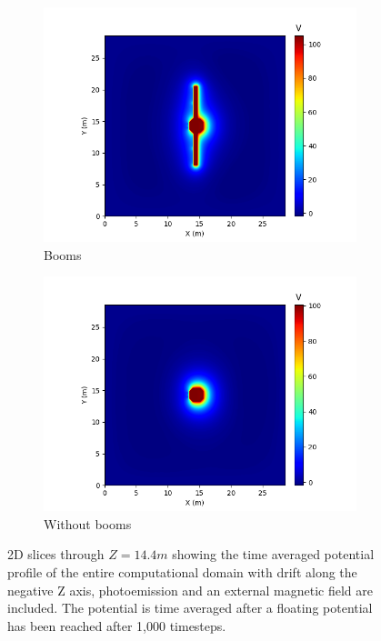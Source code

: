 \begin{figure}[H]
  \begin{subfigure}[b]{0.6\textwidth}
    \includegraphics[width=\textwidth]{figures/MMO/BField/WB/P_BField_WB.png}
    \caption{Booms}
    \label{fig:P_BField_WB}
  \end{subfigure}
  \hfill
  \begin{subfigure}[b]{0.6\textwidth}
    \includegraphics[width=\textwidth]{figures/MMO/BField/NB/P_BField_NB.png}
    \caption{Without booms}
    \label{fig:P_BField_NB}
  \end{subfigure}
  \label{fig:Pot_BField}
  \caption{2D slices through $Z = 14.4 m$ showing the time averaged potential profile of the entire computational domain with drift along the negative Z axis, photoemission and an external magnetic field are included. The potential is time averaged after a floating potential has been reached after 1,000 timesteps.}
\end{figure}

